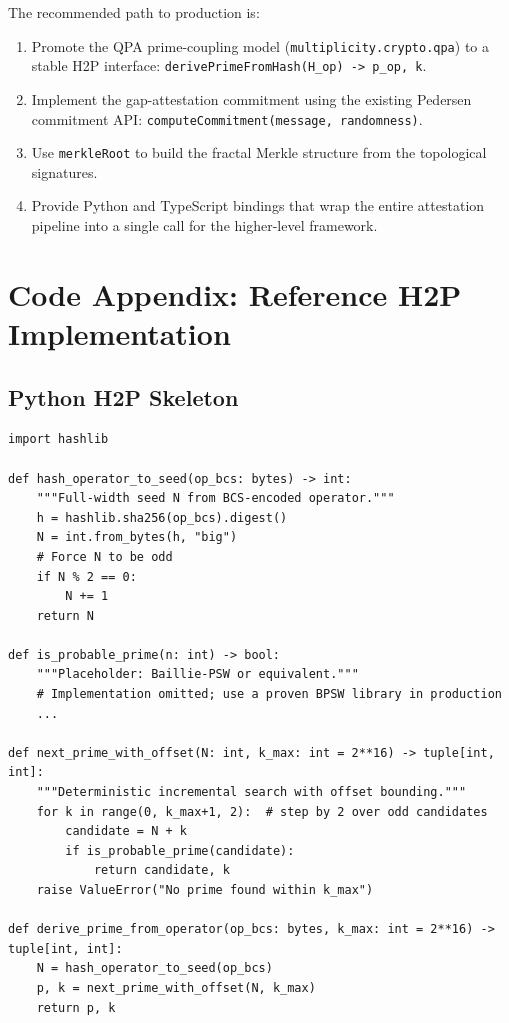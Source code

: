 \documentclass[11pt]{article}
\begin{document}
The recommended path to production is:

\begin{enumerate}[leftmargin=*]
  \item Promote the QPA prime-coupling model (\texttt{multiplicity.crypto.qpa}) to a stable H2P interface: \texttt{derivePrimeFromHash(H\_op) -> p\_op, k}.
  \item Implement the gap-attestation commitment using the existing Pedersen commitment API: \texttt{computeCommitment(message, randomness)}.
  \item Use \texttt{merkleRoot} to build the fractal Merkle structure from the topological signatures.
  \item Provide Python and TypeScript bindings that wrap the entire attestation pipeline into a single call for the higher-level framework.
\end{enumerate}

\section{Code Appendix: Reference H2P Implementation}

\subsection{Python H2P Skeleton}

\begin{lstlisting}
import hashlib

def hash_operator_to_seed(op_bcs: bytes) -> int:
    """Full-width seed N from BCS-encoded operator."""
    h = hashlib.sha256(op_bcs).digest()
    N = int.from_bytes(h, "big")
    # Force N to be odd
    if N % 2 == 0:
        N += 1
    return N

def is_probable_prime(n: int) -> bool:
    """Placeholder: Baillie-PSW or equivalent."""
    # Implementation omitted; use a proven BPSW library in production
    ...

def next_prime_with_offset(N: int, k_max: int = 2**16) -> tuple[int, int]:
    """Deterministic incremental search with offset bounding."""
    for k in range(0, k_max+1, 2):  # step by 2 over odd candidates
        candidate = N + k
        if is_probable_prime(candidate):
            return candidate, k
    raise ValueError("No prime found within k_max")

def derive_prime_from_operator(op_bcs: bytes, k_max: int = 2**16) -> tuple[int, int]:
    N = hash_operator_to_seed(op_bcs)
    p, k = next_prime_with_offset(N, k_max)
    return p, k
\end{lstlisting}
\end{document}

